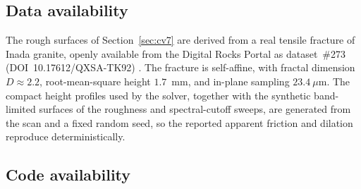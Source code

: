 \documentclass{svjour3}                 %
\begin{document}
\begin{appendix}
\subsection{Data availability}

The rough surfaces of Section~\ref{sec:cv7} are derived from a real tensile fracture of Inada granite, openly
available from the Digital Rocks Portal as dataset~\#273 (DOI~10.17612/QXSA-TK92) \citep{inada2020digitalrocks}.
The fracture is self-affine, with fractal dimension $D\approx2.2$, root-mean-square height $1.7$~mm, and in-plane
sampling $23.4~\mu$m. The compact height profiles used by the solver, together with the synthetic band-limited
surfaces of the roughness and spectral-cutoff sweeps, are generated from the scan and a fixed random seed, so the
reported apparent friction and dilation reproduce deterministically.

\subsection{Code availability}


\end{appendix}
\end{document}
